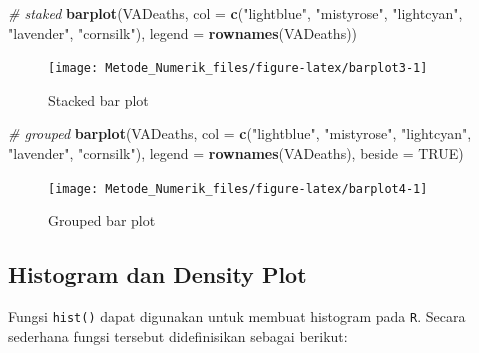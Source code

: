 \documentclass[
]{book}
\newenvironment{Shaded}{\begin{snugshade}}{\end{snugshade}}
\newcommand{\AttributeTok}[1]{\textcolor[rgb]{0.13,0.29,0.53}{#1}}
\newcommand{\CommentTok}[1]{\textcolor[rgb]{0.56,0.35,0.01}{\textit{#1}}}
\newcommand{\ConstantTok}[1]{\textcolor[rgb]{0.56,0.35,0.01}{#1}}
\newcommand{\FunctionTok}[1]{\textcolor[rgb]{0.13,0.29,0.53}{\textbf{#1}}}
\newcommand{\NormalTok}[1]{#1}
\newcommand{\StringTok}[1]{\textcolor[rgb]{0.31,0.60,0.02}{#1}}
\theoremstyle{definition}
\theoremstyle{definition}
\theoremstyle{definition}
\theoremstyle{definition}
\theoremstyle{remark}
\begin{document}
\begin{Shaded}
\begin{Highlighting}[]
\CommentTok{\# staked}
\FunctionTok{barplot}\NormalTok{(VADeaths,}
         \AttributeTok{col =} \FunctionTok{c}\NormalTok{(}\StringTok{"lightblue"}\NormalTok{, }\StringTok{"mistyrose"}\NormalTok{, }\StringTok{"lightcyan"}\NormalTok{, }
                 \StringTok{"lavender"}\NormalTok{, }\StringTok{"cornsilk"}\NormalTok{),}
        \AttributeTok{legend =} \FunctionTok{rownames}\NormalTok{(VADeaths))}
\end{Highlighting}
\end{Shaded}

\begin{figure}

{\centering \texttt{[image: Metode\_Numerik\_files/figure-latex/barplot3-1]} 

}

\caption{Stacked bar plot}\label{fig:barplot3}
\end{figure}

\begin{Shaded}
\begin{Highlighting}[]
\CommentTok{\# grouped}
\FunctionTok{barplot}\NormalTok{(VADeaths,}
         \AttributeTok{col =} \FunctionTok{c}\NormalTok{(}\StringTok{"lightblue"}\NormalTok{, }\StringTok{"mistyrose"}\NormalTok{, }\StringTok{"lightcyan"}\NormalTok{, }
                 \StringTok{"lavender"}\NormalTok{, }\StringTok{"cornsilk"}\NormalTok{),}
        \AttributeTok{legend =} \FunctionTok{rownames}\NormalTok{(VADeaths), }\AttributeTok{beside =} \ConstantTok{TRUE}\NormalTok{)}
\end{Highlighting}
\end{Shaded}

\begin{figure}

{\centering \texttt{[image: Metode\_Numerik\_files/figure-latex/barplot4-1]} 

}

\caption{Grouped bar plot}\label{fig:barplot4}
\end{figure}

\hypertarget{histogram}{%
\subsection{Histogram dan Density Plot}\label{histogram}}

Fungsi \texttt{hist()} dapat digunakan untuk membuat histogram pada \texttt{R}. Secara sederhana fungsi tersebut didefinisikan sebagai berikut:
\end{document}
